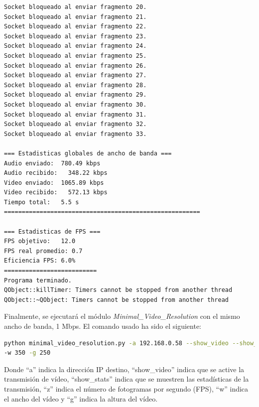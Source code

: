 \begin{lstlisting}[language=bash,basicstyle=\ttfamily\scriptsize]
Socket bloqueado al enviar fragmento 20.
Socket bloqueado al enviar fragmento 21.
Socket bloqueado al enviar fragmento 22.
Socket bloqueado al enviar fragmento 23.
Socket bloqueado al enviar fragmento 24.
Socket bloqueado al enviar fragmento 25.
Socket bloqueado al enviar fragmento 26.
Socket bloqueado al enviar fragmento 27.
Socket bloqueado al enviar fragmento 28.
Socket bloqueado al enviar fragmento 29.
Socket bloqueado al enviar fragmento 30.
Socket bloqueado al enviar fragmento 31.
Socket bloqueado al enviar fragmento 32.
Socket bloqueado al enviar fragmento 33.

=== Estadisticas globales de ancho de banda ===
Audio enviado:	780.49 kbps
Audio recibido:   348.22 kbps
Video enviado:	1065.89 kbps
Video recibido:   572.13 kbps
Tiempo total: 	5.5 s
=======================================================

=== Estadisticas de FPS ===
FPS objetivo: 	12.0
FPS real promedio: 0.7
Eficiencia FPS:	6.0%
==========================
Programa terminado.
QObject::killTimer: Timers cannot be stopped from another thread
QObject::~QObject: Timers cannot be stopped from another thread
\end{lstlisting}
\vspace{\baselineskip}

\newpage

Finalmente, se ejecutará el módulo \textit{Minimal\_Video\_Resolution} con el mismo ancho de banda, 1 Mbps. El comando usado ha sido el siguiente:
\begin{lstlisting}[language=bash,basicstyle=\ttfamily\scriptsize]
python minimal_video_resolution.py -a 192.168.0.58 --show_video --show_stats -z 12 \\
-w 350 -g 250
\end{lstlisting}
Donde ``a'' indica la dirección IP destino, ``show\_video'' indica que se active la transmisión de vídeo, ``show\_stats'' indica que se muestren las estadísticas de la transmisión, ``z'' indica el número de fotogramas por segundo (FPS), ``w'' indica el ancho del vídeo y ``g'' indica la altura del vídeo.
\vspace{\baselineskip}

